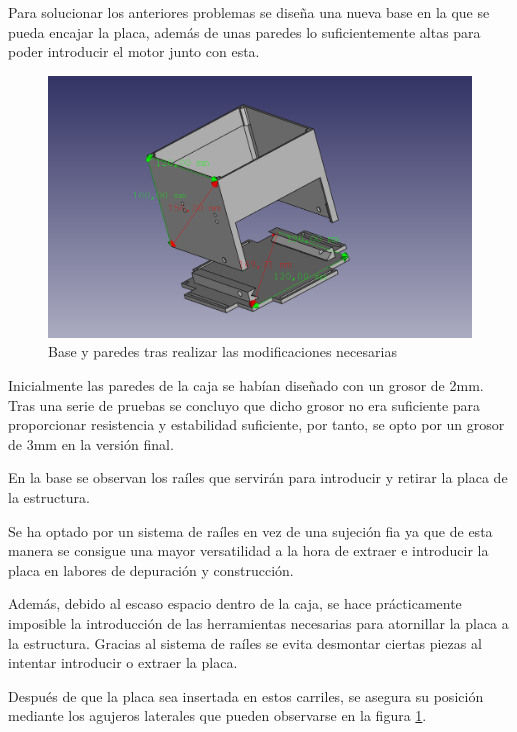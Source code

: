 Para solucionar los anteriores problemas se diseña una nueva base en la que se pueda encajar la placa, además de unas paredes lo suficientemente altas para poder introducir el motor junto con esta.

 \begin{figure}[H]
    \centering
    \includegraphics[width=.9\linewidth]{pictures/paredesybasenuevas.png}
    \caption{Base y paredes tras realizar las modificaciones necesarias}
    \label{fig:placa_y_paredes_nuevas}
\end{figure}

Inicialmente las paredes de la caja se habían diseñado con un grosor de 2mm. Tras una serie de pruebas se concluyo que dicho grosor no era suficiente para proporcionar resistencia y estabilidad suficiente, por tanto, se opto por un grosor de 3mm en la versión final.

En la base se observan los raíles que servirán para introducir y retirar la placa de la estructura. 

Se ha optado por un sistema de raíles en vez de una sujeción fia ya que de esta manera se consigue una mayor versatilidad a la hora de extraer e introducir la placa en labores de depuración y construcción. 

Además, debido al escaso espacio dentro de la caja, se hace prácticamente imposible la introducción de las herramientas necesarias para atornillar la placa a la estructura. Gracias al sistema de raíles se evita desmontar ciertas piezas al intentar introducir o extraer la placa.

Después de que la placa sea insertada en estos carriles, se asegura su posición mediante los agujeros laterales que pueden observarse en la figura \ref{fig:placa_y_paredes_nuevas}.

